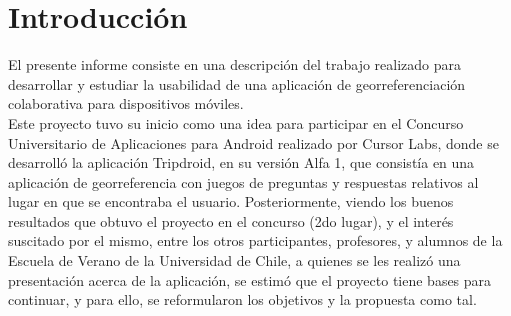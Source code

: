 \documentclass[10pt,letterpaper]{article}
\begin{document}
\begin{abstract}
\begin{minipage}{1\textwidth}
\begin{multicols}{2}
\begin{enumerate}
\begin{itemize}
 \item Agregar nuevos lugares a la aplicación para realizar más pruebas con usuarios.
  \item Elaborar una nueva versión que incluya gamification. Esto mediante agregar Items como recompensa a los usuarios por validar correctamente, los que les permitan desbloquear nuevos lugares, o información acerca de los mismos.
  \item Establecer una red de interacción de usuarios dentro de la aplicación, de modo que puedan intercambiar items por otros, o bien acceso a lugares.
  \item Añadir la opción de compartir estas acciones realizadas en la aplicación en las redes sociales más populares.
\end{itemize}

\end{enumerate}

\end{multicols}
\end{minipage}
\end{abstract}

\newpage
\tableofcontents
\setcounter{tocdepth}{1}

\newpage
\section{Introducción}

El presente informe consiste en una descripción del trabajo realizado para desarrollar y estudiar la usabilidad de una aplicación de georreferenciación colaborativa para dispositivos móviles.\\

Este proyecto tuvo su inicio como una idea para participar en el Concurso Universitario de Aplicaciones para Android realizado por Cursor Labs, donde se desarrolló la aplicación Tripdroid, en su versión Alfa 1, que consistía en una aplicación de georreferencia con juegos de preguntas y respuestas relativos al lugar en que se encontraba el usuario. Posteriormente, viendo los buenos resultados que obtuvo el proyecto en el concurso (2do lugar), y el interés suscitado por el mismo, entre los otros participantes, profesores, y alumnos de la Escuela de Verano de la Universidad de Chile, a quienes se les realizó una presentación acerca de la aplicación, se estimó que el proyecto tiene bases para continuar, y para ello, se reformularon los objetivos y la propuesta como tal.\\
\end{document}
